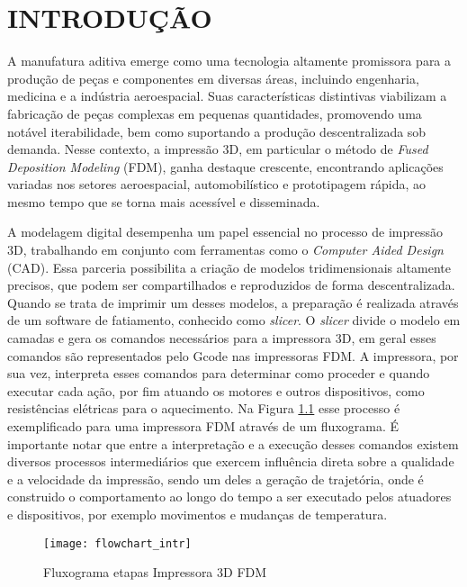 \chapter{INTRODUÇÃO}
A manufatura aditiva emerge como uma tecnologia altamente promissora para a produção de peças e componentes em diversas áreas, incluindo engenharia, medicina e a indústria aeroespacial. Suas características distintivas viabilizam a fabricação de peças complexas em pequenas quantidades, promovendo uma notável iterabilidade, bem como suportando a produção descentralizada sob demanda. Nesse contexto, a impressão 3D, em particular o método de \textit{Fused Deposition Modeling} (FDM), ganha destaque crescente, encontrando aplicações variadas nos setores aeroespacial, automobilístico e prototipagem rápida, ao mesmo tempo que se torna mais acessível e disseminada.

A modelagem digital desempenha um papel essencial no processo de impressão 3D, trabalhando em conjunto com ferramentas como o \textit{Computer Aided Design} (CAD). Essa parceria possibilita a criação de modelos tridimensionais altamente precisos, que podem ser compartilhados e reproduzidos de forma descentralizada. Quando se trata de imprimir um desses modelos, a preparação é realizada através de um software de fatiamento, conhecido como \textit{slicer}. O \textit{slicer} divide o modelo em camadas e gera os comandos necessários para a impressora 3D, em geral esses comandos são representados pelo Gcode nas impressoras FDM. A impressora, por sua vez, interpreta esses comandos para determinar como proceder e quando executar cada ação, por fim atuando os motores e outros dispositivos, como resistências elétricas para o aquecimento. Na Figura \ref{fig:flowchart_intr} esse processo é exemplificado para uma impressora FDM através de um fluxograma. É importante notar que entre a interpretação e a execução desses comandos existem diversos processos intermediários que exercem influência direta sobre a qualidade e a velocidade da impressão, sendo um deles a geração de trajetória, onde é construido o comportamento ao longo do tempo a ser executado pelos atuadores e dispositivos, por exemplo movimentos e mudanças de temperatura.

\begin{figure}[H]
    \begin{center}
        \caption{Fluxograma etapas Impressora 3D FDM}
        \texttt{[image: flowchart\_intr]}

        \label{fig:flowchart_intr}
    \end{center}
\end{figure}

